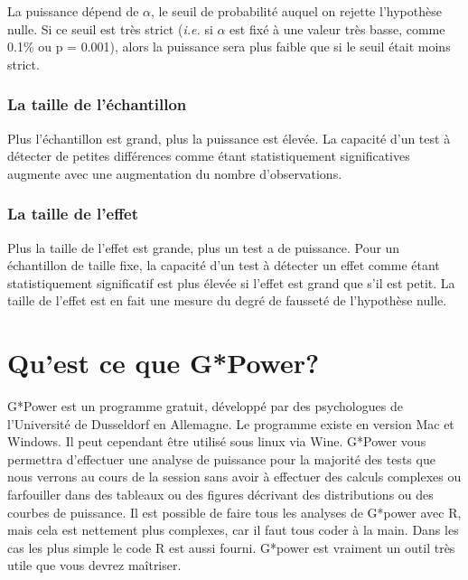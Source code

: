 \documentclass[12pt,]{book}
\begin{document}
La puissance dépend de \(\alpha\), le seuil de probabilité auquel on rejette l'hypothèse nulle.
Si ce seuil est très strict (\emph{i.e.} si \(\alpha\) est fixé à une valeur très basse, comme 0.1\% ou p = 0.001), alors la puissance sera plus faible que si le seuil était moins strict.

\hypertarget{la-taille-de-luxe9chantillon}{%
\subsubsection*{La taille de l'échantillon}\label{la-taille-de-luxe9chantillon}}

Plus l'échantillon est grand, plus la puissance est élevée.
La capacité d'un test à détecter de petites différences comme étant statistiquement significatives augmente avec une augmentation du nombre d'observations.

\hypertarget{la-taille-de-leffet}{%
\subsubsection*{La taille de l'effet}\label{la-taille-de-leffet}}

Plus la taille de l'effet est grande, plus un test a de puissance.
Pour un échantillon de taille fixe, la capacité d'un test à détecter un effet comme étant statistiquement significatif est plus élevée si l'effet est grand que s'il est petit.
La taille de l'effet est en fait une mesure du degré de fausseté de l'hypothèse nulle.

\hypertarget{quest-ce-que-gpower}{%
\section{Qu'est ce que G*Power?}\label{quest-ce-que-gpower}}

G*Power est un programme gratuit, développé par des psychologues de l'Université de Dusseldorf en Allemagne.
Le programme existe en version Mac et Windows.
Il peut cependant être utilisé sous linux via Wine.
G*Power vous permettra d'effectuer une analyse de puissance pour la majorité des tests que nous verrons au cours de la session sans avoir à effectuer des calculs complexes ou farfouiller dans des tableaux ou des figures décrivant des distributions ou des courbes de puissance.
Il est possible de faire tous les analyses de G*power avec R, mais cela est nettement plus complexes, car il faut tous coder à la main. Dans les cas les plus simple le code R est aussi fourni.
G*power est vraiment un outil très utile que vous devrez maîtriser.
\end{document}

